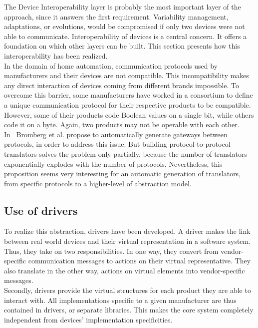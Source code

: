 The Device Interoperability layer is probably the most important layer of the approach, since it answers the first requirement. Variability management, adaptations, or evolutions, would be compromised if only two devices were not able to communicate. Interoperability of devices is a central concern. It offers a foundation on which other layers can be built. This section presents how this interoperability has been realized.\\

In the domain of home automation, communication protocols used by manufacturers and their devices are not compatible. This incompatibility makes any direct interaction of devices coming from different brands impossible. To overcome this barrier, some manufacturers have worked in a consortium to define a unique communication protocol for their respective products to be compatible. However, some of their products code Boolean values on a single bit, while others code it on a byte. Again, two products may not be operable with each other.\\
In~\cite{Bromberg:2009} Bromberg et al. propose to automatically generate gateways between protocols, in order to address this issue. But building protocol-to-protocol translators solves the problem only partially, because the number of translators exponentially explodes with the number of protocols. Nevertheless, this proposition seems very interesting for an automatic generation of translators, from specific protocols to a higher-level of abstraction model.

\subsection{Use of drivers}
\label{subsec:useOfDrivers}
To realize this abstraction, drivers have been developed. A driver makes the link between real world devices and their virtual representation in a software system. Thus, they take on two responsibilities. In one way, they convert from vendor-specific communication messages to actions on their virtual representative. They also translate in the other way, actions on virtual elements into vendor-specific messages. \\
Secondly, drivers provide the virtual structures for each product they are able to interact with. All implementations specific to a given manufacturer are thus contained in drivers, or separate libraries. This makes the core system completely independent from devices' implementation specificities.\\

